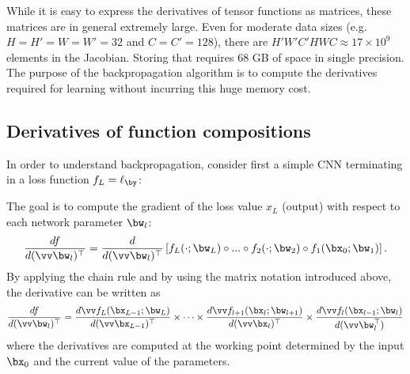 While it is easy to express the derivatives of tensor functions as matrices, these matrices are in general extremely large. Even for moderate data sizes (e.g. $H=H'=W=W'=32$ and $C=C'=128$), there are $H'W'C'HWC \approx 17 \times 10^9$ elements in the Jacobian. Storing that requires 68 GB of space in single precision. The purpose of the backpropagation algorithm is to compute the derivatives required for learning without incurring this huge memory cost.

\subsection{Derivatives of function compositions}

In order to understand backpropagation, consider first a simple CNN terminating in a loss function $f_L = \ell_\by$:
\begin{center}
\end{center}
The goal is to compute the gradient of the loss value $x_L$ (output) with respect to each network parameter $\bw_l$:
\[
\frac{df}{d(\vv \bw_l)^\top} = 
\frac{d}{d(\vv \bw_l)^\top}
\left[f_L(\cdot;\bw_L) \circ ... \circ 
f_2(\cdot;\bw_2) \circ f_1(\bx_0;\bw_1)\right].
\]
By applying the chain rule and by using the matrix notation introduced above, the derivative can be written as
\begin{equation}\label{e:chain-rule}
\frac{df}{d(\vv \bw_l)^\top} 
= 
\frac{d\vv f_L(\bx_{L-1};\bw_{L})}{d(\vv\bx_{L-1})^\top}
\times
\dots
\times
\frac{d\vv f_{l+1}(\bx_{l};\bw_{l+1})}{d(\vv\bx_{l})^\top}
\times
\frac{d\vv f_l(\bx_{l-1};\bw_{l})}{d(\vv\bw_l^\top)}
\end{equation}
where the derivatives are computed at the working point determined by the input $\bx_0$ and the current value of the parameters. 

